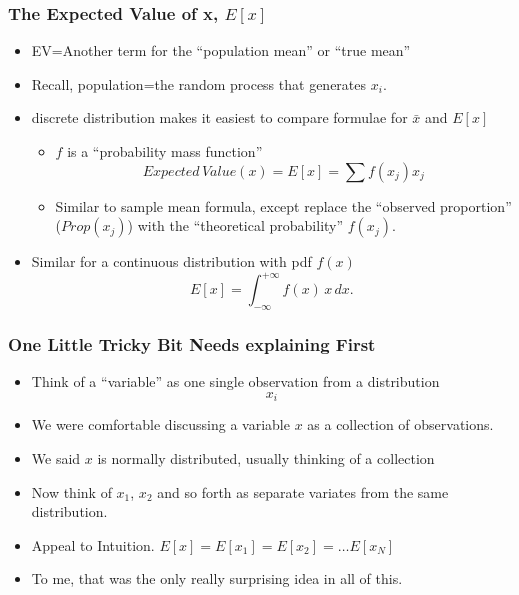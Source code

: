 \documentclass[10pt,english]{beamer}
\begin{document}
\begin{frame}
  \frametitle{The Expected Value of x, $E[x]$}
 
  \begin{itemize}
  \item EV=Another term for the {}``population mean'' or ``true mean''
  \item  Recall, population=the random process that generates $x_{i}$.
  \item discrete distribution makes it easiest to compare formulae for
    $\bar{x}$ and $E[x]$
    \begin{itemize}
    \item  $f$ is a {}``probability mass function''
      \begin{equation}
        Expected\, Value(x)=E[x]=\sum f(x_{j})x_{j}\label{eq:-4}\end{equation}
    \item    Similar to sample mean formula, except replace the {}``observed
      proportion'' ($Prop(x_{j})$) with the {}``theoretical probability'' $f(x_{j})$. 
    \end{itemize}
  \item Similar for a continuous distribution with pdf $f(x)$ 
    \begin{equation}     
      E[x] = \int_{-\infty}^{+\infty}f(x)\, x\, dx.
    \end{equation}     
    
  \end{itemize}
\end{frame}


\begin{frame}
  \frametitle{One Little Tricky Bit Needs explaining First}
  \begin{itemize}
  \item Think of a ``variable'' as one single observation from a distribution
    \begin{equation}
      x_i
    \end{equation}
  \item We were comfortable discussing a variable $x$ as a collection
    of observations. 
  \item We said $x$ is normally distributed, usually thinking of a collection
  \item Now think of $x_1$, $x_2$ and so forth as separate variates
    from the same distribution. 
    \item Appeal to Intuition. $E[x] = E[x_1] = E[x_2]= \ldots E[x_N]$
    \item To me, that was the only really surprising idea in all of this.
  \end{itemize}
\end{frame}
\end{document}
